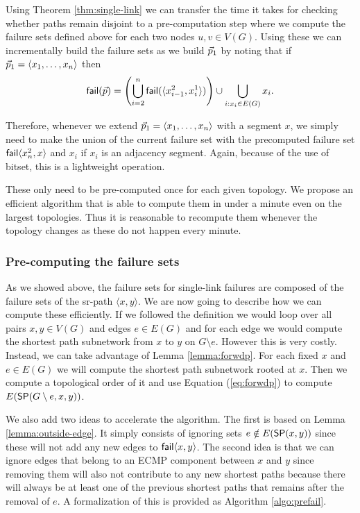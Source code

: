 Using Theorem \ref{thm:single-link} we can transfer the time it takes for checking whether paths remain disjoint to
a pre-computation step where we compute the failure sets defined above for each two nodes $u, v \in V(G)$. Using these 
we can incrementally build the failure sets as we build $\sr{p}_1$ by noting that if $\sr{p}_1 = \langle x_1, \ldots, x_n \rangle$ then
$$
\fail(\sr{p}) = \left( \bigcup_{i = 2}^n \fail(\langle x^2_{i - 1}, x^1_i \rangle) \right) \cup \bigcup_{i : x_i \in E(G)} x_i.
$$

Therefore, whenever we extend $\sr{p}_1 = \langle x_1, \ldots, x_n \rangle$ with a segment $x$, we simply need to make 
the union of the current failure set with the precomputed failure set $\fail \langle x^2_n, x \rangle$ and $x_i$ if $x_i$
is an adjacency segment. Again, because of the use of bitset, this is a lightweight operation.

These only need to be pre-computed once for each given topology. We propose an efficient algorithm that is able to
compute them in under a minute even on the largest topologies. Thus it is 
reasonable to recompute them whenever the topology changes as these do not happen every minute.

% 

\subsubsection{Pre-computing the failure sets}

As we showed above, the failure sets for single-link failures are composed of the failure sets of the sr-path $\langle x, y \rangle$.
We are now going to describe how we can compute these efficiently. If we followed the definition we would loop over all pairs $x, y \in V(G)$ and
edges $e \in E(G)$ and for each edge we would compute the shortest path subnetwork from $x$ to $y$ on $G \setminus e$. 
However this is very costly. Instead, we can take advantage of Lemma \ref{lemma:forwdp}. For each fixed $x$ and $e \in E(G)$ we will compute the
shortest path subnetwork rooted at $x$. Then we compute a topological order of it and use Equation (\ref{eq:forwdp}) to compute
$E(\sp(G \setminus e, x, y))$.

We also add two ideas to accelerate the algorithm. The first is based on Lemma \ref{lemma:outside-edge}. It simply consists of ignoring
sets $e \notin E(\sp(x, y))$ since these will not add any new edges to $\fail \langle x, y \rangle$. The second idea is that we can ignore edges that
belong to an ECMP component between $x$ and $y$ since removing them will also not contribute to any new shortest paths because there will
always be at least one of the previous shortest paths that remains after the removal of $e$.
A formalization of this is provided as Algorithm \ref{algo:prefail}.

